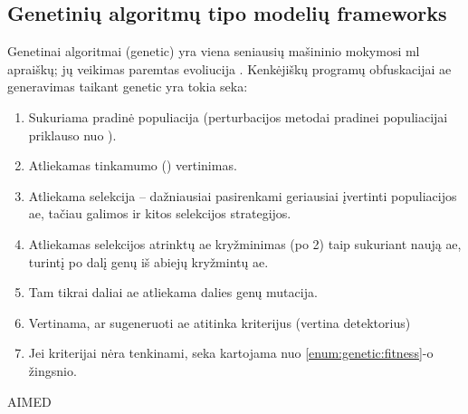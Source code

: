 \subsection{Genetinių algoritmų tipo modelių \glspl{framework}}\label{sec:literature:genetic}

Genetinai algoritmai (\acs{genetic}) yra viena seniausių mašininio mokymosi \acs{ml} apraiškų; jų veikimas paremtas evoliucija \citeplace. Kenkėjiškų programų obfuskacijai \acs{ae} generavimas taikant \acs{genetic} yra tokia seka:
\begin{enumerate}
    \item Sukuriama pradinė populiacija (perturbacijos metodai pradinei populiacijai priklauso nuo ).
    \item Atliekamas tinkamumo () vertinimas.\label{enum:genetic:fitness}
    \item Atliekama selekcija -- dažniausiai pasirenkami geriausiai įvertinti populiacijos \acs{ae}, tačiau galimos ir kitos selekcijos strategijos.
    \item Atliekamas selekcijos atrinktų \acs{ae} kryžminimas (po 2) taip sukuriant naują \acs{ae}, turintį po dalį genų iš abiejų kryžmintų \acs{ae}.
    \item Tam tikrai daliai \ac{ae} atliekama dalies genų mutacija.
    \item Vertinama, ar sugeneruoti \acs{ae} atitinka kriterijus (vertina detektorius)
    \item Jei kriterijai nėra tenkinami, seka kartojama nuo \ref{enum:genetic:fitness}-o žingsnio.
\end{enumerate}
\cite{yusteOptimizationCodeCaves2022}

\begin{describeFramework}{AIMED}{\cite{castroAIMEDEvolvingMalware2019}}
\end{describeFramework}

